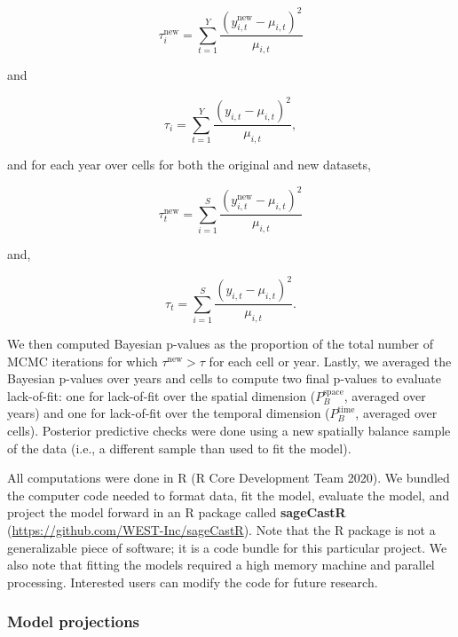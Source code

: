 \documentclass[
  12pt,
]{article}
\begin{document}
\begin{equation}
\tau^{\text{new}}_i = \sum^Y_{t=1} \frac{\left(y^{\text{new}}_{i,t} - \mu_{i,t}\right)^2}{\mu_{i,t}}    
\end{equation}

\noindent{}and

\begin{equation}
\tau_i = \sum^Y_{t=1} \frac{\left(y_{i,t} - \mu_{i,t}\right)^2}{\mu_{i,t}},    
\end{equation}

\noindent{}and for each year over cells for both the original and new datasets,

\begin{equation}
\tau^{\text{new}}_t = \sum^S_{i=1} \frac{\left(y^{\text{new}}_{i,t} - \mu_{i,t}\right)^2}{\mu_{i,t}}    
\end{equation}

\noindent{}and,

\begin{equation}
\tau_t = \sum^S_{i=1} \frac{\left(y_{i,t} - \mu_{i,t}\right)^2}{\mu_{i,t}}.    
\end{equation}

\noindent{}We then computed Bayesian p-values as the proportion of the total number of MCMC iterations for which \(\tau^{\text{new}} > \tau\) for each cell or year.
Lastly, we averaged the Bayesian p-values over years and cells to compute two final p-values to evaluate lack-of-fit: one for lack-of-fit over the spatial dimension (\(P_B^{\text{space}}\), averaged over years) and one for lack-of-fit over the temporal dimension (\(P_B^{\text{time}}\), averaged over cells).
Posterior predictive checks were done using a new spatially balance sample of the data (i.e., a different sample than used to fit the model).

All computations were done in R (R Core Development Team 2020).
We bundled the computer code needed to format data, fit the model, evaluate the model, and project the model forward in an R package called \textbf{sageCastR} (\url{https://github.com/WEST-Inc/sageCastR}).
Note that the R package is not a generalizable piece of software; it is a code bundle for this particular project.
We also note that fitting the models required a high memory machine and parallel processing.
Interested users can modify the code for future research.

\hypertarget{model-projections}{%
\subsubsection{Model projections}\label{model-projections}}
\end{document}

